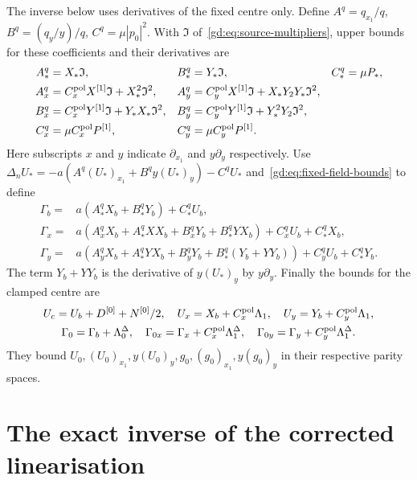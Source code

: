 The inverse below uses derivatives of the fixed centre only.
Define $A^q=q_{x_1}/q$, $B^q=(q_y/y)/q$, $C^q=\mu|p_0|^2$.
With $\mathfrak I$ of~\eqref{gd:eq:source-multipliers}, upper bounds for these
coefficients and their derivatives are
\begin{equation}\label{gd:eq:coefficient-derivatives}
 \begin{aligned}
 A_*^q&=X_*\mathfrak I,& B_*^q&=Y_*\mathfrak I,& C_*^q&=\mu P_*,\\
 A_x^q&=C_x^{\rm pol}X^{[1]}\mathfrak I+X_*^2\mathfrak I^2,&
 A_y^q&=C_y^{\rm pol}X^{[1]}\mathfrak I+X_*Y_2Y_*\mathfrak I^2,\\
 B_x^q&=C_x^{\rm pol}Y^{[1]}\mathfrak I+Y_*X_*\mathfrak I^2,&
 B_y^q&=C_y^{\rm pol}Y^{[1]}\mathfrak I+Y_*^2Y_2\mathfrak I^2,\\
 C_x^q&=\mu C_x^{\rm pol}P^{[1]},&
 C_y^q&=\mu C_y^{\rm pol}P^{[1]} .
 \end{aligned}
\end{equation}
Here subscripts $x$ and $y$ indicate $\partial_{x_1}$ and
$y\partial_y$ respectively.
Use $\Delta_nU_*=-a(A^q(U_*)_{x_1}+B^qy(U_*)_y)-C^qU_*$
and~\eqref{gd:eq:fixed-field-bounds} to define
\begin{equation}\label{gd:eq:gstar}
 \begin{split}
 \Gamma_b={}&a(A_*^qX_b+B_*^qY_b)+C_*^qU_b,\\
 \Gamma_x={}&a(A_x^qX_b+A_*^qXX_b+B_x^qY_b+B_*^qYX_b)
                      +C_x^qU_b+C_*^qX_b,\\
 \Gamma_y={}&a(A_y^qX_b+A_*^qYX_b+B_y^qY_b+B_*^q(Y_b+YY_b))
                      +C_y^qU_b+C_*^qY_b .
 \end{split}
\end{equation}
The term $Y_b+YY_b$ is the derivative of $y(U_*)_y$ by
$y\partial_y$. Finally the bounds for the clamped centre are
\begin{equation}\label{gd:eq:centre-bounds}
 \begin{gathered}
 U_c=U_b+D^{[0]}+N^{[0]}/2,\quad
 U_x=X_b+C_x^{\rm pol}\Lambda_1,\quad U_y=Y_b+C_y^{\rm pol}\Lambda_1,\\
 \Gamma_0=\Gamma_b+\Lambda^\Delta_0,\quad \Gamma_{0x}=\Gamma_x+C_x^{\rm pol}\Lambda^\Delta_1,\quad
 \Gamma_{0y}=\Gamma_y+C_y^{\rm pol}\Lambda^\Delta_1 .
 \end{gathered}
\end{equation}
They bound $U_0,(U_0)_{x_1},y(U_0)_y,g_0,
(g_0)_{x_1},y(g_0)_y$ in their respective parity spaces.

\section{The exact inverse of the corrected linearisation}
\label{gd:sec:coupled}

